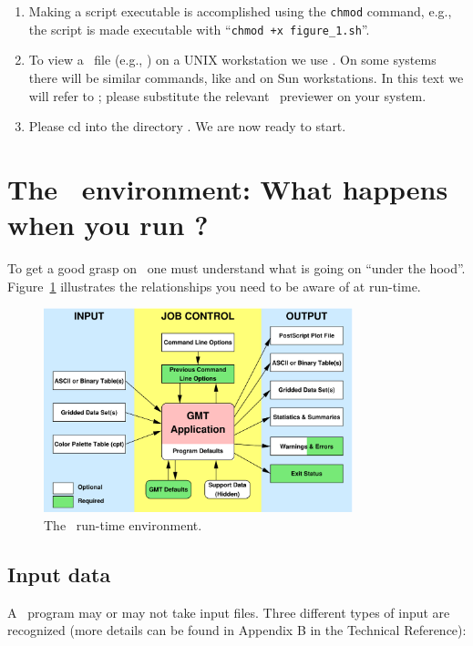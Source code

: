 \documentclass{report}
\begin{document}
\begin{enumerate}
\item Making a script executable is accomplished using the \texttt{chmod}
command, e.g., the script  is made executable
with ``\texttt{chmod +x figure\_1.sh}''.

\item To view a \PS\ file (e.g., ) on a UNIX workstation
we use  .  On some systems there
will be similar commands, like  and 
on Sun workstations.  In this text we will refer to
; please substitute the relevant \PS\ previewer
on your system.

\item Please cd into the directory .  We are
now ready to start.

\end{enumerate}

\section{The \gmt\ environment: What happens when you run \gmt ?}

To get a good grasp on \GMT\ one must understand what is going on ``under
the hood''.  Figure~\ref{fig:GMT_Environment} illustrates the relationships
you need to be aware of at run-time.

\begin{figure}[h]
   \centering\includegraphics[width=0.8\textwidth]{fig/GMT_Environment}
   \caption{The \gmt\ run-time environment.}
   \label{fig:GMT_Environment}
\end{figure}

\subsection{Input data}
A \GMT\ program may or may not take input files.  Three different
types of input are recognized (more details can be found in Appendix
B in the Technical Reference):
\end{document}
